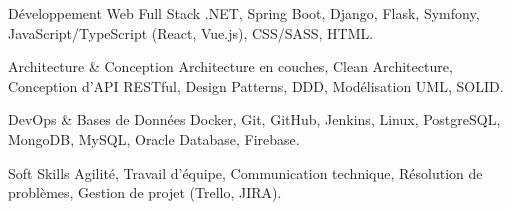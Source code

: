 

\begin{cvskills}

  \cvskill
    {Développement Web Full Stack} %
    {.NET, Spring Boot, Django, Flask, Symfony, JavaScript/TypeScript (React, Vue.js), CSS/SASS, HTML.} %



  \cvskill
    {Architecture \& Conception} %
    {Architecture en couches, Clean Architecture, Conception d'API RESTful, Design Patterns, DDD, Modélisation UML, SOLID.} %

  \cvskill
    {DevOps & Bases de Données} %
    {Docker, Git, GitHub, Jenkins, Linux, PostgreSQL, MongoDB, MySQL, Oracle Database, Firebase.} %

  \cvskill
    {Soft Skills} %
    {Agilité, Travail d'équipe, Communication technique, Résolution de problèmes, Gestion de projet (Trello, JIRA).} %

\end{cvskills}